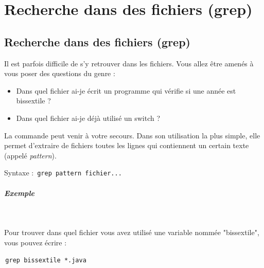 \documentclass[11pt,a4paper]{article}
\begin{document}
			\par\medskip
            \par
        \section{Recherche dans des fichiers (grep)}\subsection{Recherche dans des fichiers (grep)}
					Il est parfois difficile de s'y retrouver dans les fichiers.
					Vous allez \^etre amen\'es \`a vous poser des questions du genre :
				
            \par
        
					\begin{itemize}
				
			\item 
						Dans quel fichier ai-je \'ecrit un programme qui v\'erifie si une ann\'ee est bissextile ?
					
			\item 
						Dans quel fichier ai-je d\'ej\`a utilis\'e un switch ?
					
					\end{itemize}
				
					La commande \verb@grep@ peut venir \`a votre secours.
					Dans son utilisation la plus simple, elle permet d'extraire de fichiers
					toutes les lignes qui contiennent un certain texte (appel\'e 
					\textit{pattern}).
					\par
				
					Syntaxe : 
					\,\verb|grep pattern fichier...|\,
            \par
        
			
		\subparagraph{Exemple} 
		
					\textcolor{white}{.} \par
				
					Pour trouver dans quel fichier vous avez utilis\'e une variable nomm\'ee "bissextile",
					vous pouvez \'ecrire :
					\par
				\par
				\,\verb|grep bissextile *.java|\,
            \par
        
\end{document}

